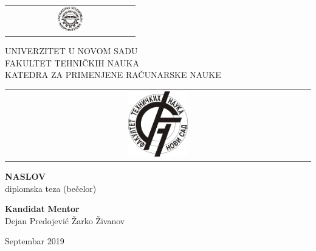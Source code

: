 \begin{titlepage}
\begin{tabular}{@{}c@{}}
\includegraphics[width=0.2\textwidth]{img/uns.jpg}
\end{tabular}
\begin{minipage}[c]{0.6\textwidth}
\centering
UNIVERZITET U NOVOM SADU\\
FAKULTET TEHNIČKIH NAUKA\\
KATEDRA ZA PRIMENJENE RAČUNARSKE NAUKE
\end{minipage}
\begin{tabular}{@{}c@{}}
\includegraphics[width=0.2\textwidth]{img/ftn.jpg}
\end{tabular}

\vspace*{\fill}
\centering
{\Large \bf NASLOV}\\
diplomska teza (bečelor)\\
\vspace*{\fill}

\textbf{Kandidat}
\hfill
\textbf{Mentor} \\
Dejan Predojević
\hfill
Žarko Živanov

Septembar 2019

\end{titlepage}